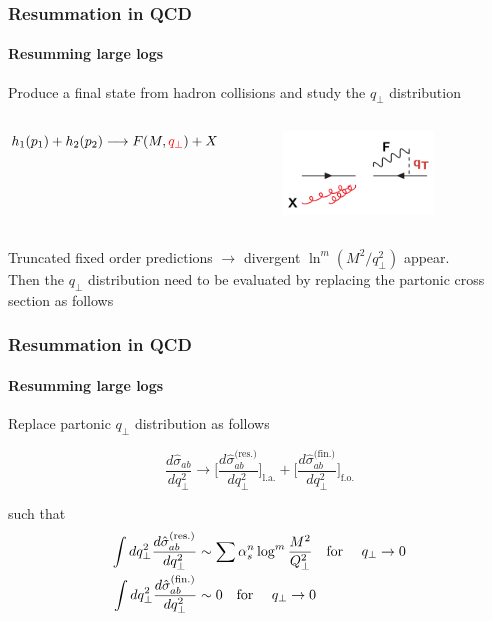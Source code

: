 \documentclass[aspectratio=43]{beamer}
\begin{document}
\begin{frame}

	\frametitle{Resummation in QCD}
	\framesubtitle{Resumming large logs}
	
	Produce a final state from hadron collisions and study the $q_{\perp}$ distribution 
	
	\begin{columns}
	
	$h_{1}(p_{1}) + h_{2}(p_{2}) \longrightarrow F(M, {\color{red}q_{\perp}}) + X$
	

	\begin{figure}
		\includegraphics[width = 4cm]{plots/qT_diagram.png}
	\end{figure}
	
	\end{columns}

	\vspace{1cm}

	Truncated fixed order predictions $\rightarrow$ {\color{red}divergent $\ln^{m}(M^{2}/q_{\perp}^{2})$ appear}.\\
	Then the $q_{\perp}$ distribution need to be evaluated by replacing the partonic cross section as follows

\end{frame}

\begin{frame}

	\frametitle{Resummation in QCD}
	\framesubtitle{Resumming large logs}

	Replace partonic $q_{\perp}$ distribution as follows
	
	\begin{equation}
		\frac{d\hat{\sigma}_{ab}}{dq_{\perp}^{2}} \rightarrow 
		\Bigg[ \frac{d\hat{\sigma}^{\textrm{(res.)}}_{ab}}{dq_{\perp}^{2}} \Bigg]_{\textrm{l.a.}} + 
		\Bigg[ \frac{d\hat{\sigma}^{\textrm{(fin.)}}_{ab}}{dq_{\perp}^{2}} \Bigg]_{\textrm{f.o.}} \nonumber
	\end{equation}

	such that
	\begin{align}
		\int dq_{\perp}^{2} \frac{d\hat{\sigma}^{\textrm{(res.)}}_{ab}}{dq_{\perp}^{2}} &\sim \sum \alpha_{s}^{n} \log^{m} \frac{M^{2}}{Q_{\perp}^{2}} \textrm{\quad for \quad} q_{\perp} \rightarrow 0 \nonumber \\
		\int dq_{\perp}^{2} \frac{d\hat{\sigma}^{\textrm{(fin.)}}_{ab}}{dq_{\perp}^{2}} &\sim 0 \nonumber \textrm{\quad for \quad} q_{\perp} \rightarrow 0
	\end{align}

\end{frame}
\end{document}
